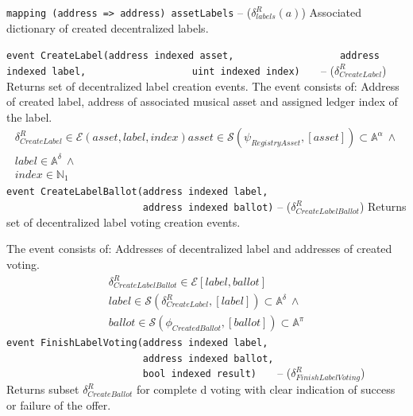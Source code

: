 \documentclass[12pt]{report}
\def\code#1{\colorbox{light-gray}{\texttt{#1}}}
\begin{document}
\code{mapping (address => address) assetLabels} – ($\delta^R_{labels}(a)$)\hfill\null\linebreak
Associated dictionary of created decentralized labels.

\code{event CreateLabel(address indexed asset,}\hfill\null\linebreak
\code{~~~~~~~~~~~~~~~~~~address indexed label,}\hfill\null\linebreak
\code{~~~~~~~~~~~~~~~~~~uint indexed index)~~~} – ($\delta^R_{CreateLabel}$)\hfill\null\linebreak
Returns set of decentralized label creation events. The event consists of: Address of created label, address of associated musical asset and assigned ledger index of the label.
\begin{equation}
\begin{aligned}
\delta^R_{CreateLabel} \in \mathcal{E}(asset, label, index)
asset \in \mathcal{S}(\psi_{RegistryAsset}, [asset]) \subset \mathbb{A}^\alpha \ \wedge \\
label \in \mathbb{A}^\delta \ \wedge \\
index \in \mathbb{N}_1
\end{aligned}
\end{equation}
\code{event CreateLabelBallot(address indexed label,~} \hfill\null\linebreak
\code{~~~~~~~~~~~~~~~~~~~~~~~~address indexed ballot)} – ($\delta^R_{CreateLabelBallot}$)\hfill\null\linebreak
Returns set of decentralized label voting creation events.

The event consists of: Addresses of decentralized label and addresses of created voting.
\begin{equation}
\begin{aligned}
\delta^R_{CreateLabelBallot} \in \mathcal{E}[label, ballot] \\
label \in \mathcal{S}(\delta^R_{CreateLabel}, [label]) \subset \mathbb{A}^\delta \ \wedge \\
ballot \in \mathcal{S}(\phi_{CreatedBallot}, [ballot]) \subset \mathbb{A}^\pi
\end{aligned}
\end{equation}
\code{event FinishLabelVoting(address indexed label,~}\hfill\null\linebreak
\code{~~~~~~~~~~~~~~~~~~~~~~~~address indexed ballot,}\hfill\null\linebreak
\code{~~~~~~~~~~~~~~~~~~~~~~~~bool indexed result)~~~} – ($\delta^R_{FinishLabelVoting}$)\hfill\null\linebreak
Returns subset  $\delta^R_{CreateBallot}$ for complete	d voting with clear indication of success or failure of the offer.
\end{document}

